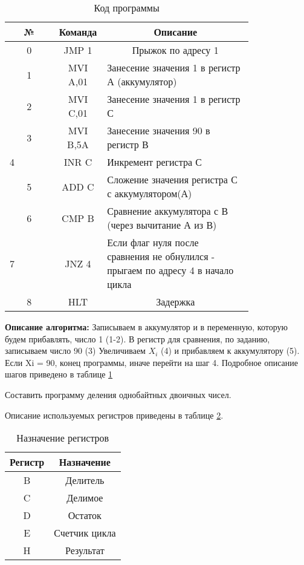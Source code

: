 \documentclass[a4paper,14pt]{extarticle}
\begin{document}
\begin{problem*}
\begin{table}[h!]
	\centering
	\caption{Код программы}
	\begin{tabular}{|c|m{0.2\linewidth}|p{0.6\linewidth}|}
		\hline
		№ & \multicolumn{1}{c|}{Команда} & \multicolumn{1}{c|}{Описание} \\ \hline
		0 & \multicolumn{1}{c|}{JMP 1} & \multicolumn{1}{c|}{Прыжок по адресу 1} \\ \hline
		1 & \multicolumn{1}{c|}{MVI A,01} & Занесение значения 1 в регистр А (аккумулятор) \\ \hline
		\multicolumn{1}{|c|}{2} & \multicolumn{1}{c|}{MVI C,01} & Занесение значения 1 в регистр С \\ \hline
		3 &\multicolumn{1}{c|}{MVI B,5A} & Занесение значения 90 в регистр В \\ \hline
		\multicolumn{1}{|l|}{4} & \multicolumn{1}{c|}{
			INR C} & Инкремент регистра С \\ \hline
		5 & \multicolumn{1}{c|}{ADD C} & Сложение значения регистра С с аккумулятором(А) \\ \hline
		6 & \multicolumn{1}{c|}{CMP B} & Сравнение аккумулятора с В (через вычитание А из В) \\ \hline
		\multicolumn{1}{|l|}{7} & \multicolumn{1}{c|}{JNZ 4}  & {Если флаг нуля после сравнения не обнулился - прыгаем по адресу 4 в начало цикла} \\ \hline
		8 & \multicolumn{1}{c|}{HLT} & \multicolumn{1}{c|}{Задержка} \\ \hline
	\end{tabular}
	\label{tab:code}
\end{table}
\textbf{Описание алгоритма:}
Записываем в аккумулятор и в переменную, которую будем прибавлять, число 1 (1-2). В регистр для сравнения, по заданию, записываем число 90 (3) Увеличиваем $X_i$ (4) и прибавляем к аккумулятору (5). Если Xi = 90, конец
программы, иначе перейти на шаг 4. Подробное описание шагов приведено в таблице \ref{tab:code}
\newpage
\end{problem*}

\begin{problem*}
	Составить программу деления однобайтных двоичных чисел.
	
	\nonum
\end{problem*}
Описание используемых регистров приведены в таблице \ref{tab:registers2}.
\begin{table}[h!]
	\centering
	\caption{Назначение регистров}
	\begin{tabular}{|c|c|}
		\hline
		Регистр & Назначение \\ \hline
		B & Делитель \\ \hline
		C & Делимое \\ \hline
		D & Остаток \\ \hline
		E & \multicolumn{1}{l|}{Счетчик цикла} \\ \hline
		H & Результат \\ \hline
	\end{tabular}
	\label{tab:registers2}
\end{table}
\end{document}
